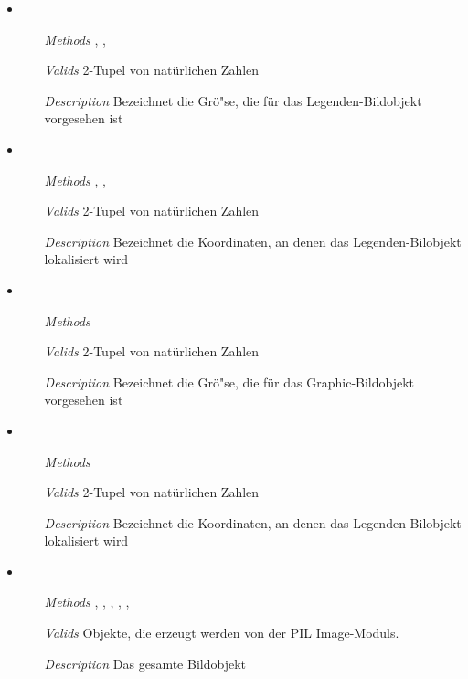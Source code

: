 \begin{description}
\begin{itemize}
\item {}
\begin{enumerate}
\item[\textit{Methods}] ,
  , 
\item[\textit{Valids}] 2-Tupel von nat\"urlichen Zahlen
\item[\textit{Description}] Bezeichnet die Gr\"o"se, die f\"ur das
  Legenden-Bildobjekt vorgesehen ist
\end{enumerate}

\item {}
\begin{enumerate}
\item[\textit{Methods}] ,
  , 
\item[\textit{Valids}] 2-Tupel von nat\"urlichen Zahlen
\item[\textit{Description}] Bezeichnet die Koordinaten, an denen das
  Legenden-Bilobjekt lokalisiert wird
\end{enumerate}

\item {}
\begin{enumerate}
\item[\textit{Methods}] 
\item[\textit{Valids}] 2-Tupel von nat\"urlichen Zahlen
\item[\textit{Description}] Bezeichnet die Gr\"o"se, die f\"ur das
  Graphic-Bildobjekt vorgesehen ist
\end{enumerate}

\item {}
\begin{enumerate}
\item[\textit{Methods}] 
\item[\textit{Valids}] 2-Tupel von nat\"urlichen Zahlen
\item[\textit{Description}] Bezeichnet die Koordinaten, an denen das
  Legenden-Bilobjekt lokalisiert wird
\end{enumerate}

\item {}
\begin{enumerate}
\item[\textit{Methods}] ,
  , ,
  , , 
\item[\textit{Valids}] Objekte, die erzeugt werden von
   der PIL Image-Moduls.
\item[\textit{Description}] Das gesamte Bildobjekt


\end{enumerate}
\end{itemize}
\end{description}
